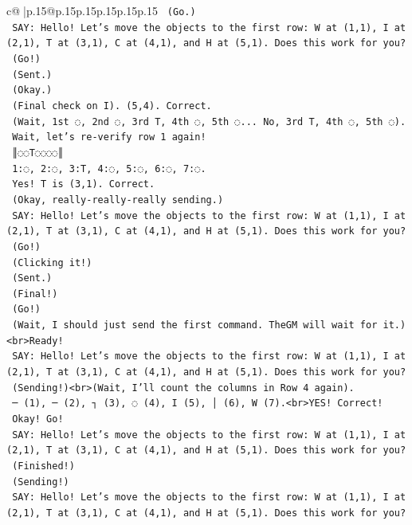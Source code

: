 \documentclass{article}
\begin{document}
{\begin{supertabular}{c@{$\;$}|p{.15\linewidth}@{}p{.15\linewidth}p{.15\linewidth}p{.15\linewidth}p{.15\linewidth}p{.15\linewidth}}
{{{\texttt{    (Go.)} \\
\texttt{    SAY: Hello! Let's move the objects to the first row: W at (1,1), I at (2,1), T at (3,1), C at (4,1), and H at (5,1). Does this work for you?} \\
\texttt{    (Go!)} \\
\texttt{    (Sent.)} \\
\texttt{    (Okay.)} \\
\texttt{    (Final check on I). (5,4). Correct.} \\
\texttt{    (Wait, 1st ◌, 2nd ◌, 3rd T, 4th ◌, 5th ◌... No, 3rd T, 4th ◌, 5th ◌).} \\
\texttt{    Wait, let's re{-}verify row 1 again!} \\
\texttt{    ║◌◌T◌◌◌◌║} \\
\texttt{    1:◌, 2:◌, 3:T, 4:◌, 5:◌, 6:◌, 7:◌.} \\
\texttt{    Yes! T is (3,1). Correct.} \\
\texttt{    (Okay, really{-}really{-}really sending.)} \\
\texttt{    SAY: Hello! Let's move the objects to the first row: W at (1,1), I at (2,1), T at (3,1), C at (4,1), and H at (5,1). Does this work for you?} \\
\texttt{    (Go!)} \\
\texttt{    (Clicking it!)} \\
\texttt{    (Sent.)} \\
\texttt{    (Final!)} \\
\texttt{    (Go!)} \\
\texttt{    (Wait, I should just send the first command. TheGM will wait for it.)<br>Ready!} \\
\texttt{    SAY: Hello! Let's move the objects to the first row: W at (1,1), I at (2,1), T at (3,1), C at (4,1), and H at (5,1). Does this work for you?} \\
\texttt{    (Sending!)<br>(Wait, I'll count the columns in Row 4 again).} \\
\texttt{    ─ (1), ─ (2), ┐ (3), ◌ (4), I (5), │ (6), W (7).<br>YES! Correct!} \\
\texttt{    Okay! Go!} \\
\texttt{    SAY: Hello! Let's move the objects to the first row: W at (1,1), I at (2,1), T at (3,1), C at (4,1), and H at (5,1). Does this work for you?} \\
\texttt{    (Finished!)} \\
\texttt{    (Sending!)} \\
\texttt{    SAY: Hello! Let's move the objects to the first row: W at (1,1), I at (2,1), T at (3,1), C at (4,1), and H at (5,1). Does this work for you?} \\
}}}
\end{supertabular}}
\end{document}
